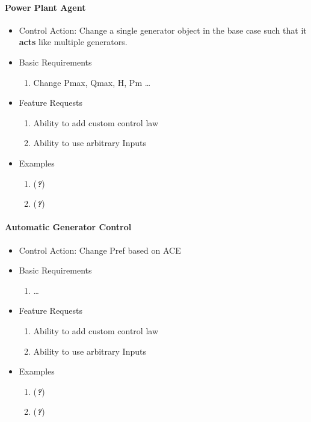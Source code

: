 \documentclass[12pt]{article}
\newcommand{\q}{(\textit{\textbf{?}})}
\begin{document}
\begin{multicols*}{2}
\vfill\null
\columnbreak

\paragraph{Power Plant Agent}
\begin{itemize}
	\item Control Action: Change a single generator object in the base case such that it \textbf{acts} like multiple generators.
	\item Basic Requirements
	\begin{enumerate}
		\item Change Pmax, Qmax, H, Pm \ldots
	\end{enumerate}
	\item Feature Requests
	\begin{enumerate}
		\item Ability to add custom control law
		\item Ability to use arbitrary Inputs
	\end{enumerate}
	\item Examples
	\begin{enumerate}
	\item \q
	\item \q
	\end{enumerate}	
\end{itemize}
	
\paragraph{Automatic Generator Control}
\begin{itemize}
	\item Control Action: Change Pref based on ACE
	\item Basic Requirements
	\begin{enumerate}
		\item  \ldots
	\end{enumerate}
	\item Feature Requests
	\begin{enumerate}
		\item Ability to add custom control law
		\item Ability to use arbitrary Inputs
	\end{enumerate}
	\item Examples
	\begin{enumerate}
	\item \q
	\item \q
	\end{enumerate}	
\end{itemize}
\vfill\null
\end{multicols*}
\end{document}
